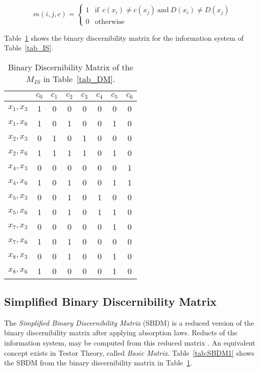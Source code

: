 \documentclass[authoryear,preprint,review,12pt]{elsarticle}
\begin{document}
  \begin{equation}
  	m(i, j, c)=\left\lbrace\begin{array}{cl}
  			1 & \mathrm{if~~}c(x_i) \neq c(x_j) \mathrm{~and~} D(x_i) \neq D(x_j)\\
  			0 								   & \mathrm{otherwise} 
  	\end{array}\right.
  \end{equation} 
  
  Table~\ref{tab_BDM} shows the binary discernibility matrix for the information system of Table~\ref{tab_IS}.  
  
  \begin{table}[htb]
		\caption{Binary Discernibility Matrix of the $M_{IS}$ in Table~\ref{tab_DM}.} \label{tab_BDM}
		\centering
 	\begin{tabular}{c|ccccccc}
 		& $c_0$ & $c_1$ & $c_2$ & $c_3$ & $c_4$ & $c_5$ & $c_6$\\
 		\hline
		$x_1,x_3$ & 1 & 0 & 0 & 0 & 0 & 0 & 0 \\
		$x_1,x_6$ & 1 & 0 & 1 & 0 & 0 & 1 & 0 \\
		$x_2,x_3$ & 0 & 1 & 0 & 1 & 0 & 0 & 0 \\
		$x_2,x_6$ & 1 & 1 & 1 & 1 & 0 & 1 & 0 \\
		$x_4,x_3$ & 0 & 0 & 0 & 0 & 0 & 0 & 1 \\
		$x_4,x_6$ & 1 & 0 & 1 & 0 & 0 & 1 & 1 \\
		$x_5,x_3$ & 0 & 0 & 1 & 0 & 1 & 0 & 0 \\
		$x_5,x_6$ & 1 & 0 & 1 & 0 & 1 & 1 & 0 \\
		$x_7,x_3$ & 0 & 0 & 0 & 0 & 0 & 1 & 0 \\
		$x_7,x_6$ & 1 & 0 & 1 & 0 & 0 & 0 & 0 \\
		$x_8,x_3$ & 0 & 0 & 1 & 0 & 0 & 1 & 0 \\
		$x_8,x_6$ & 1 & 0 & 0 & 0 & 0 & 1 & 0 
 	\end{tabular}             
  \end{table}
  
\subsection{Simplified Binary Discernibility Matrix}
  The \textit{Simplified Binary Discernibility Matrix} (SBDM) is a reduced version of the binary discernibility
  matrix after applying absorption laws. Reducts of the information system, may be computed from this reduced matrix \citep{Yao09}. An equivalent concept exists in Testor Theory, called \textit{Basic Matrix}. Table~\ref{tab:SBDM1} shows the SBDM from the binary discernibility matrix in Table~\ref{tab_BDM}.
  
\end{document}
